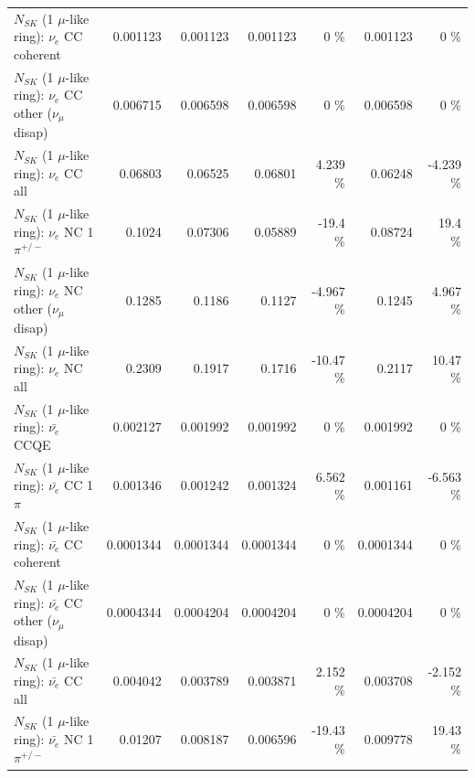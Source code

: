 \begin{table}
\begin{tabular}{| l | r | r | r  r | r  r |}
                               $N_{SK}$ (1 $\mu$-like ring): $\nu_e$ CC coherent &        0.001123 &        0.001123 &        0.001123 &        0 \%  &        0.001123 &        0 \%  \\ 
                $N_{SK}$ (1 $\mu$-like ring): $\nu_e$ CC other ($\nu_\mu$ disap) &        0.006715 &        0.006598 &        0.006598 &        0 \%  &        0.006598 &        0 \%  \\ 
                                  $N_{SK}$ (1 $\mu$-like ring): $\nu_{e}$ CC all &         0.06803 &         0.06525 &         0.06801 &    4.239 \%  &         0.06248 &   -4.239 \%  \\ 
\hline
                           $N_{SK}$ (1 $\mu$-like ring): $\nu_e$ NC 1$\pi^{+/-}$ &          0.1024 &         0.07306 &         0.05889 &    -19.4 \%  &         0.08724 &     19.4 \%  \\ 
                $N_{SK}$ (1 $\mu$-like ring): $\nu_e$ NC other ($\nu_\mu$ disap) &          0.1285 &          0.1186 &          0.1127 &   -4.967 \%  &          0.1245 &    4.967 \%  \\ 
                                  $N_{SK}$ (1 $\mu$-like ring): $\nu_{e}$ NC all &          0.2309 &          0.1917 &          0.1716 &   -10.47 \%  &          0.2117 &    10.47 \%  \\ 
\hline
\hline
\hline
                                $N_{SK}$ (1 $\mu$-like ring): $\bar{\nu_e}$ CCQE &        0.002127 &        0.001992 &        0.001992 &        0 \%  &        0.001992 &        0 \%  \\ 
                           $N_{SK}$ (1 $\mu$-like ring): $\bar{\nu_e}$ CC 1$\pi$ &        0.001346 &        0.001242 &        0.001324 &    6.562 \%  &        0.001161 &   -6.563 \%  \\ 
                         $N_{SK}$ (1 $\mu$-like ring): $\bar{\nu_e}$ CC coherent &       0.0001344 &       0.0001344 &       0.0001344 &        0 \%  &       0.0001344 &        0 \%  \\ 
          $N_{SK}$ (1 $\mu$-like ring): $\bar{\nu_e}$ CC other ($\nu_\mu$ disap) &       0.0004344 &       0.0004204 &       0.0004204 &        0 \%  &       0.0004204 &        0 \%  \\ 
                            $N_{SK}$ (1 $\mu$-like ring): $\bar{\nu_{e}}$ CC all &        0.004042 &        0.003789 &        0.003871 &    2.152 \%  &        0.003708 &   -2.152 \%  \\ 
\hline
                     $N_{SK}$ (1 $\mu$-like ring): $\bar{\nu_e}$ NC 1$\pi^{+/-}$ &         0.01207 &        0.008187 &        0.006596 &   -19.43 \%  &        0.009778 &    19.43 \%  \\ 

\end{tabular}
\end{table}
